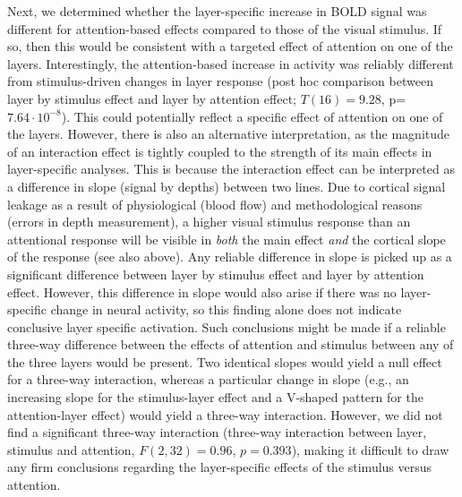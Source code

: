 \documentclass[9pt,lineno]{aperture}
\begin{document}
Next, we determined whether the layer-specific increase in BOLD signal was different for attention-based effects compared to those of the visual stimulus. If so, then this would be consistent with a targeted effect of attention on one of the layers. Interestingly, the attention-based increase in activity was reliably different from stimulus-driven changes in layer response (post hoc comparison between layer by stimulus effect and layer by attention effect; $T(16)=9.28$, p=$7.64\cdot10^{-8}$). This could potentially reflect a specific effect of attention on one of the layers. However, there is also an alternative interpretation, as the magnitude of an interaction effect is tightly coupled to the strength of its main effects in layer-specific analyses. 
This is because the interaction effect can be interpreted as a difference in slope (signal by depths) between two lines. Due to cortical signal leakage as a result of physiological (blood flow) and methodological reasons (errors in depth measurement), a higher visual stimulus response than an attentional response will be visible in \emph{both} the main effect \emph{and} the cortical slope of the response (see also above). Any reliable difference in slope is picked up as a significant difference between layer by stimulus effect and layer by attention effect. However, this difference in slope would also arise if there was no layer-specific change in neural activity, so this finding alone does not indicate conclusive layer specific activation. Such conclusions might be made if a reliable three-way difference between the effects of attention and stimulus between any of the three layers would be present. 
Two identical slopes would yield a null effect for a three-way interaction, whereas a particular change in slope (e.g., an increasing slope for the stimulus-layer effect and a V-shaped pattern for the attention-layer effect) would yield a three-way interaction. 
However, we did not find a significant three-way interaction (three-way interaction between layer, stimulus and attention, $F(2,32)=0.96$, $p=0.393$), making it difficult to draw any firm conclusions regarding the layer-specific effects of the stimulus versus attention.
\end{document}

